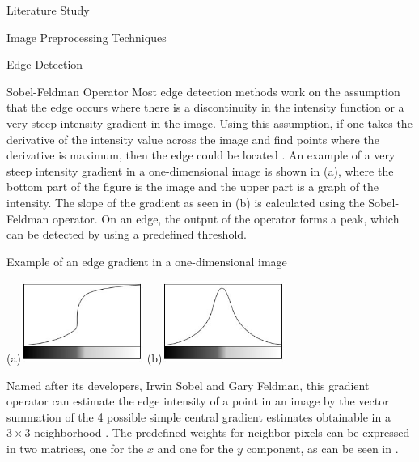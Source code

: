 \documentclass{matthijs}
\begin{document}
\begin{hoofdstuk}{Literature Study}
\begin{paragraaf}{Image Preprocessing Techniques}
\begin{subparagraaf}{Edge Detection}
\begin{subsubparagraaf}{Sobel-Feldman Operator}
					Most edge detection methods work on the assumption that the edge occurs where there is a discontinuity in the intensity function or a very steep intensity gradient in the image.
					Using this assumption, if one takes the derivative of the intensity value across the image and find points where the derivative is maximum, then the edge could be located \cite{vincent2009descriptive}.
					An example of a very steep intensity gradient in a one-dimensional image is shown in (a), where the bottom part of the figure is the image and the upper part is a graph of the intensity.
					The slope of the gradient as seen in (b) is calculated using the Sobel-Feldman operator.
					On an edge, the output of the operator forms a peak, which can be detected by using a predefined threshold.

					\begin{figuur}{Example of an edge gradient in a one-dimensional image}

						(a)\includegraphics[width=0.3\textwidth]{sinha2017sobel-img1.jpg}
						(b)\includegraphics[width=0.3\textwidth]{sinha2017sobel-img2.jpg}
						\cite{sinha2017sobel}

					\end{figuur}

					\bigskip

					Named after its developers, Irwin Sobel and Gary Feldman, this gradient operator can estimate the edge intensity of a point in an image by the vector summation of the 4 possible simple central gradient estimates obtainable in a $3 \times 3$ neighborhood \cite{sobel1990isotropic}.
					The predefined weights for neighbor pixels can be expressed in two matrices, one for the $x$ and one for the $y$ component, as can be seen in .


\end{subsubparagraaf}
\end{subparagraaf}
\end{paragraaf}
\end{hoofdstuk}
\end{document}
